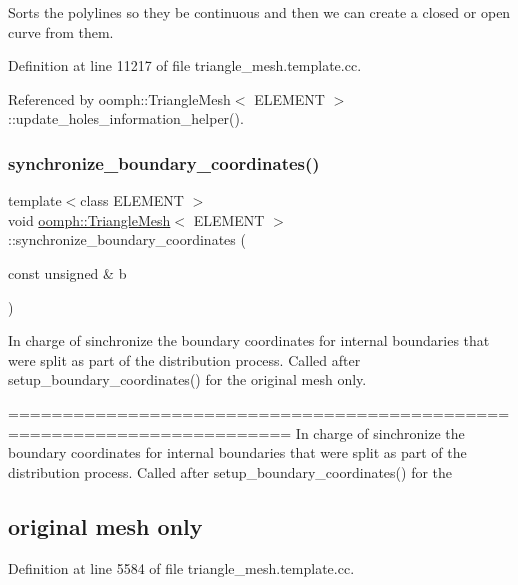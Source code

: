 Sorts the polylines so they be continuous and then we can create a closed or open curve from them. 



Definition at line 11217 of file triangle\+\_\+mesh.\+template.\+cc.



Referenced by oomph\+::\+Triangle\+Mesh$<$ E\+L\+E\+M\+E\+N\+T $>$\+::update\+\_\+holes\+\_\+information\+\_\+helper().

\mbox{\label{classoomph_1_1TriangleMesh_a4068378c7e25cc672e4f3c750f4957bc}} 
\subsubsection{\texorpdfstring{synchronize\+\_\+boundary\+\_\+coordinates()}{synchronize\_boundary\_coordinates()}}
{\footnotesize\ttfamily template$<$class E\+L\+E\+M\+E\+NT $>$ \\
void \hyperlink{classoomph_1_1TriangleMesh}{oomph\+::\+Triangle\+Mesh}$<$ E\+L\+E\+M\+E\+NT $>$\+::synchronize\+\_\+boundary\+\_\+coordinates (\begin{DoxyParamCaption}\item[{const unsigned \&}]{b }\end{DoxyParamCaption})}



In charge of sinchronize the boundary coordinates for internal boundaries that were split as part of the distribution process. Called after setup\+\_\+boundary\+\_\+coordinates() for the original mesh only. 

======================================================================== In charge of sinchronize the boundary coordinates for internal boundaries that were split as part of the distribution process. Called after setup\+\_\+boundary\+\_\+coordinates() for the \subsection*{original mesh only }

Definition at line 5584 of file triangle\+\_\+mesh.\+template.\+cc.



